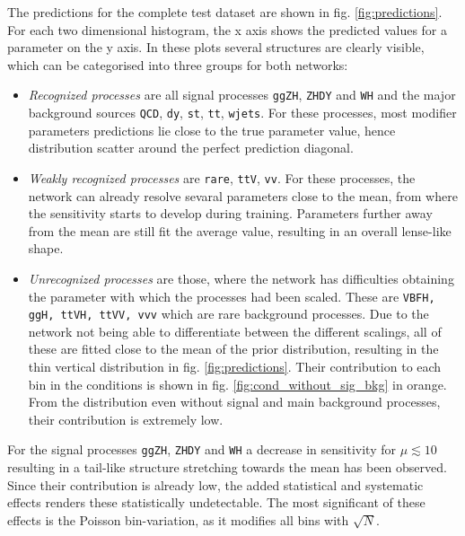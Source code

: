 
The predictions for the complete test dataset are shown in fig. \ref{fig:predictions}. For each two dimensional histogram, the x axis shows the predicted values for a parameter on the y axis. In these plots several structures are clearly visible, which can be categorised into three groups for both networks:

\begin{itemize}
    \item[] \textit{Recognized processes} are all signal processes \texttt{ggZH}, \texttt{ZHDY} and \texttt{WH} and the major background sources \texttt{QCD}, \texttt{dy}, \texttt{st}, \texttt{tt}, \texttt{wjets}. For these processes, most modifier parameters predictions lie close to the true parameter value, hence distribution scatter around the perfect prediction diagonal.

	\item[] \textit{Weakly recognized processes} are \texttt{rare}, \texttt{ttV}, \texttt{vv}. For these processes, the network can already resolve sevaral parameters close to the mean, from where the sensitivity starts to develop during training. Parameters further away from the mean are still fit the average value, resulting in an overall lense-like shape.

	\item[] \textit{Unrecognized processes} are those, where the network has difficulties obtaining the parameter with which the processes had been scaled. These are \texttt{VBFH, ggH, ttVH, ttVV, vvv} which are rare background processes. Due to the network not being able to differentiate between the different scalings, all of these are fitted close to the mean of the prior distribution, resulting in the thin vertical distribution in fig. \ref{fig:predictions}. Their contribution to each bin in the conditions is shown in fig. \ref{fig:cond_without_sig_bkg} in orange. From the distribution even without signal and main background processes, their contribution is extremely low.
\end{itemize}

For the signal processes \texttt{ggZH}, \texttt{ZHDY} and \texttt{WH} a decrease in sensitivity for $\mu\lesssim10$ resulting in a tail-like structure stretching towards the mean has been observed. Since their contribution is already low, the added statistical and systematic effects renders these statistically undetectable. The most significant of these effects is the Poisson bin-variation, as it modifies all bins with $\sqrt{N}$.

